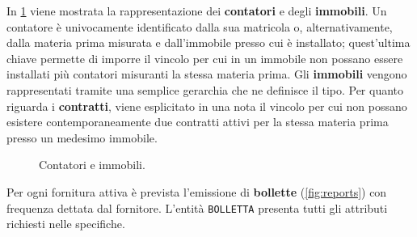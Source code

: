 \documentclass[a4paper,12pt]{report}
\begin{document}
In \cref{fig:meters_premises} viene mostrata la rappresentazione dei \textbf{contatori} e degli \textbf{immobili}. Un contatore è univocamente identificato dalla sua matricola o, alternativamente, dalla materia prima misurata e dall'immobile presso cui è installato; quest'ultima chiave permette di imporre il vincolo per cui in un immobile non possano essere installati più contatori misuranti la stessa materia prima.
\newline
Gli \textbf{immobili} vengono rappresentati tramite una semplice gerarchia che ne definisce il tipo.
\newline
Per quanto riguarda i \textbf{contratti}, viene esplicitato in una nota il vincolo per cui non possano esistere contemporaneamente due contratti attivi per la stessa materia prima presso un medesimo immobile.

\begin{figure}[H]
\centering{}
\caption{Contatori e immobili.}
\label{fig:meters_premises}
\end{figure}


Per ogni fornitura attiva è prevista l'emissione di \textbf{bollette} (\cref{fig:reports}) con frequenza dettata dal fornitore. L'entità \texttt{BOLLETTA} presenta tutti gli attributi richiesti nelle specifiche.
\end{document}
